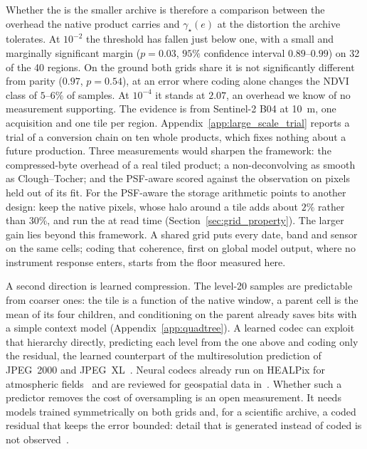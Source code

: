 Whether the  is the smaller archive is therefore a
comparison between the overhead the native product carries and
$\gamma_\star(e)$ at the distortion the archive tolerates. At $10^{-2}$
the threshold has fallen just below one, with a small and marginally
significant margin ($p=0.03$, $95\%$ confidence interval $0.89$--$0.99$)
on 32 of the 40 regions. On the ground both grids share it is not
significantly different from parity ($0.97$, $p=0.54$), at an error
where coding alone changes the NDVI class of $5$--$6\%$ of samples. At
$10^{-4}$ it stands at $2.07$, an overhead we
know of no measurement supporting. The evidence is from Sentinel-2 B04
at \SI{10}{m}, one acquisition and one tile per region. Appendix~\ref{app:large_scale_trial} reports a trial of a conversion
chain on ten whole products, which fixes nothing about a future
production. Three measurements would sharpen the framework: the
compressed-byte overhead of a real tiled product; a non-deconvolving
 as smooth as Clough--Tocher; and the PSF-aware
 scored against the observation on pixels held out of
its fit. For the PSF-aware  the storage arithmetic points
to another design: keep the native pixels, whose halo around a tile adds
about $2\%$ rather than $30\%$, and run the  at read time
(Section~\ref{sec:grid_property}). The larger gain lies beyond this
framework. A shared grid puts every date, band and sensor on the same
cells; coding that coherence, first on global model output, where no
instrument response enters, starts from the floor measured here.

A second direction is learned compression. The level-20 samples are
predictable from coarser ones: the tile is a function of the native
window, a parent cell is the mean of its four children, and conditioning
on the parent already saves bits with a simple context model
(Appendix~\ref{app:quadtree}). A learned codec can exploit that
hierarchy directly, predicting each level from the one above and coding
only the residual, the learned counterpart of the multiresolution
prediction of JPEG~2000 and JPEG~XL~\cite{cao2020srec,ma2022iwave}.
Neural codecs already run on HEALPix for atmospheric
fields~\cite{mirowski2024neural} and are reviewed for geospatial data
in~\cite{gomes2025lossy}. Whether such a predictor removes the cost of
oversampling is an open measurement. It needs models trained
symmetrically on both grids and, for a scientific archive, a coded
residual that keeps the error bounded: detail that is generated instead
of coded is not observed~\cite{aybar2024opensr}.
